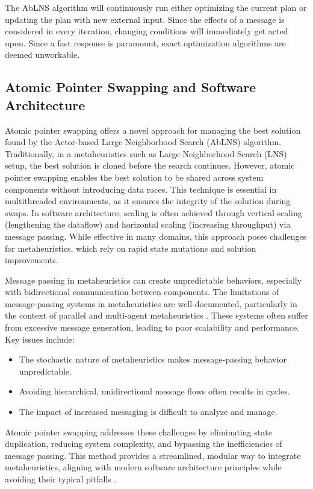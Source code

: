 The AbLNS algorithm will continuously run either optimizing the current plan or updating the plan 
with new external input. Since the effects of a message is considered in every iteration, changing 
conditions will immediately get acted upon. Since a fast response is paramount, exact optimization algorithms are deemed unworkable.

\subsection{Atomic Pointer Swapping and Software Architecture}
Atomic pointer swapping offers a novel approach for managing the best
solution found by the Actor-based Large Neighborhood Search (AbLNS) algorithm.
Traditionally, in a metaheuristics such as Large Neighborhood Search (LNS) setup, 
the best solution
is cloned before the search continues. However, atomic pointer swapping enables
the best solution to be shared across system components without introducing data
races. This technique is essential in multithreaded environments, as it ensures
the integrity of the solution during swaps. In software architecture, scaling
is often achieved through vertical scaling (lengthening the dataflow) and
horizontal scaling (increasing throughput) via message passing. While effective
in many domains, this approach poses challenges for metaheuristics, which
rely on rapid state mutations and solution improvements. 

Message passing in metaheuristics can create unpredictable behaviors,
especially with bidirectional communication between components. The
limitations of message-passing systems in metaheuristics are well-documented,
particularly in the context of parallel and multi-agent metaheuristics
\citep{talbiMetaheuristicsDesignImplementation2009}. These systems often
suffer from excessive message generation, leading to poor scalability and
performance. Key issues include: 

\begin{itemize} 
	\item The stochastic nature
		of metaheuristics makes message-passing behavior unpredictable. 
	\item Avoiding
		hierarchical, unidirectional message flows often results in cycles. 
	\item The
		impact of increased messaging is difficult to analyze and manage. 
\end{itemize}

Atomic pointer swapping addresses these challenges by eliminating state
duplication, reducing system complexity, and bypassing the inefficiencies of
message passing. This method provides a streamlined, modular way to integrate
metaheuristics, aligning with modern software architecture principles while
avoiding their typical pitfalls \citep{richards_fundamentals_2020}.
